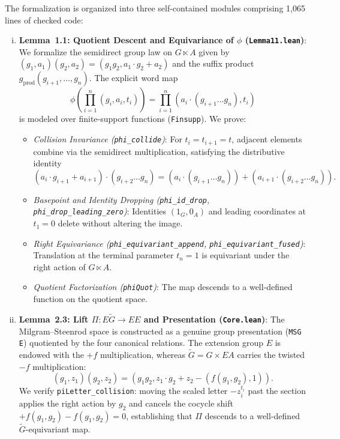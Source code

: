 \documentclass[12 pt]{article}
\theoremstyle{definition}
\begin{document}
The formalization is organized into three self-contained modules comprising 1,065 lines of checked code:

\begin{enumerate}[(i)]
    \item \textbf{Lemma~1.1: Quotient Descent and Equivariance of $\phi$ (\texttt{Lemma11.lean})}:
    We formalize the semidirect group law on $G \ltimes A$ given by $(g_1, a_1)(g_2, a_2) = (g_1 g_2, a_1 \cdot g_2 + a_2)$ and the suffix product $g_{\text{prod}}(g_{i+1}, \dots, g_n)$. The explicit word map
    \[
    \phi\left(\prod_{i=1}^n (g_i, a_i, t_i)\right) = \prod_{i=1}^n (a_i \cdot (g_{i+1} \dots g_n), t_i)
    \]
    is modeled over finite-support functions (\texttt{Finsupp}). We prove:
    \begin{itemize}
        \item \emph{Collision Invariance (\texttt{phi\_collide})}: For $t_i = t_{i+1} = t$, adjacent elements combine via the semidirect multiplication, satisfying the distributive identity
        \[
        (a_i \cdot g_{i+1} + a_{i+1}) \cdot (g_{i+2} \dots g_n) = (a_i \cdot (g_{i+1} \dots g_n)) + (a_{i+1} \cdot (g_{i+2} \dots g_n)).
        \]
        \item \emph{Basepoint and Identity Dropping (\texttt{phi\_id\_drop}, \texttt{phi\_drop\_leading\_zero})}: Identities $(1_G, 0_A)$ and leading coordinates at $t_1 = 0$ delete without altering the image.
        \item \emph{Right Equivariance (\texttt{phi\_equivariant\_append}, \texttt{phi\_equivariant\_fused})}: Translation at the terminal parameter $t_n = 1$ is equivariant under the right action of $G \ltimes A$.
        \item \emph{Quotient Factorization (\texttt{phiQuot})}: The map descends to a well-defined function on the quotient space.
    \end{itemize}

    \item \textbf{Lemma~2.3: Lift $\Pi : E\tilde{G} \to EE$ and Presentation (\texttt{Core.lean})}:
    The Milgram--Steenrod space is constructed as a genuine group presentation (\texttt{MSG E}) quotiented by the four canonical relations. The extension group $E$ is endowed with the $+f$ multiplication, whereas $\tilde{G} = G \times EA$ carries the twisted $-f$ multiplication:
    \[
    (g_1, z_1)(g_2, z_2) = (g_1 g_2, z_1 \cdot g_2 + z_2 - (f(g_1, g_2), 1)).
    \]
    We verify \texttt{piLetter\_collision}: moving the scaled letter $-z_i^{t_i}$ past the section applies the right action by $g_2$ and cancels the cocycle shift $+f(g_1, g_2) - f(g_1, g_2) = 0$, establishing that $\Pi$ descends to a well-defined $\tilde{G}$-equivariant map.


\end{enumerate}
\end{document}
